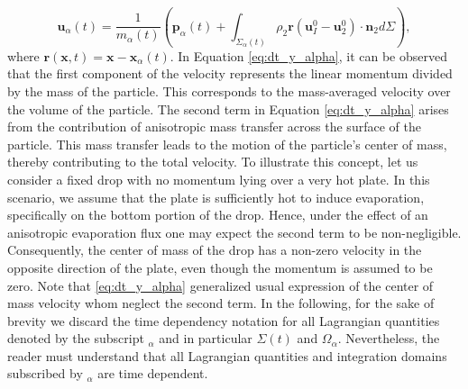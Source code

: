 \begin{equation}
    \textbf{u}_\alpha(t) = \frac{1}{m_\alpha(t)} \left(
        \textbf{p}_\alpha(t)
        +  \int_{\Sigma_\alpha(t)} \rho_2 \textbf{r} (\textbf{u}_I^0 - \textbf{u}_2^0)\cdot \textbf{n}_2 d\Sigma
        \right),
        \label{eq:dt_y_alpha}
\end{equation}
where $\textbf{r}(\textbf{x},t) = \textbf{x} - \textbf{x}_\alpha(t)$. 
In Equation \ref{eq:dt_y_alpha}, it can be observed that the first component of the velocity represents the linear momentum divided by the mass of the particle. 
This corresponds to the mass-averaged velocity over the volume of the particle.
The second term in Equation \ref{eq:dt_y_alpha} arises from the contribution of anisotropic mass transfer across the surface of the particle. 
This mass transfer leads to the motion of the particle's center of mass, thereby contributing to the total velocity.
To illustrate this concept, let us consider a fixed drop with no momentum lying over a very hot plate.
In this scenario, we assume that the plate is sufficiently hot to induce evaporation, specifically on the bottom portion of the drop.
Hence, under the effect of an anisotropic evaporation flux one may expect the second term to be non-negligible.
Consequently, the center of mass of the drop has a non-zero velocity in the opposite direction of the plate, even though the momentum is assumed to be zero.
Note that \ref{eq:dt_y_alpha} generalized usual expression of the center of mass velocity whom neglect the second term.
In the following, for the sake of brevity we discard the time dependency notation for all Lagrangian quantities denoted by the subscript $_\alpha$ and in particular $\Sigma(t)$ and $\Omega_\alpha$.
Nevertheless, the reader must understand that all Lagrangian quantities and integration domains subscribed by $_\alpha$ are time dependent. 


